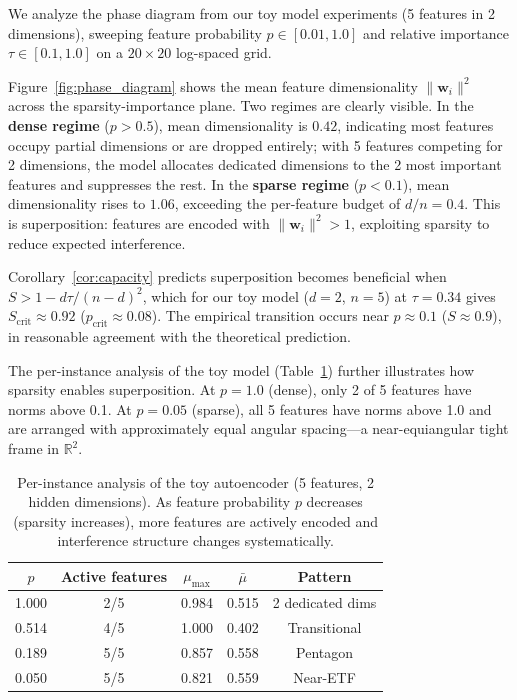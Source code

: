 We analyze the phase diagram from our toy model experiments (5 features in 2 dimensions), sweeping feature probability $p \in [0.01, 1.0]$ and relative importance $\tau \in [0.1, 1.0]$ on a $20 \times 20$ log-spaced grid.

Figure~\ref{fig:phase_diagram} shows the mean feature dimensionality $\|\mathbf{w}_i\|^2$ across the sparsity-importance plane. Two regimes are clearly visible. In the \textbf{dense regime} ($p > 0.5$), mean dimensionality is $0.42$, indicating most features occupy partial dimensions or are dropped entirely; with 5 features competing for 2 dimensions, the model allocates dedicated dimensions to the 2 most important features and suppresses the rest. In the \textbf{sparse regime} ($p < 0.1$), mean dimensionality rises to $1.06$, exceeding the per-feature budget of $d/n = 0.4$. This is superposition: features are encoded with $\|\mathbf{w}_i\|^2 > 1$, exploiting sparsity to reduce expected interference.

Corollary~\ref{cor:capacity} predicts superposition becomes beneficial when $S > 1 - d\tau/(n-d)^2$, which for our toy model ($d=2$, $n=5$) at $\tau = 0.34$ gives $S_{\text{crit}} \approx 0.92$ ($p_{\text{crit}} \approx 0.08$). The empirical transition occurs near $p \approx 0.1$ ($S \approx 0.9$), in reasonable agreement with the theoretical prediction.

The per-instance analysis of the toy model (Table~\ref{tab:toy_instances}) further illustrates how sparsity enables superposition. At $p = 1.0$ (dense), only 2 of 5 features have norms above 0.1. At $p = 0.05$ (sparse), all 5 features have norms above 1.0 and are arranged with approximately equal angular spacing---a near-equiangular tight frame in $\mathbb{R}^2$.

\begin{table}[t]
\centering
\caption{Per-instance analysis of the toy autoencoder (5 features, 2 hidden dimensions). As feature probability $p$ decreases (sparsity increases), more features are actively encoded and interference structure changes systematically.}
\label{tab:toy_instances}
\small
\begin{tabular}{ccccc}
\toprule
$p$ & \textbf{Active features} & $\mu_{\max}$ & $\bar{\mu}$ & \textbf{Pattern} \\
\midrule
1.000 & 2/5 & 0.984 & 0.515 & 2 dedicated dims \\
0.514 & 4/5 & 1.000 & 0.402 & Transitional \\
0.189 & 5/5 & 0.857 & 0.558 & Pentagon \\
0.050 & 5/5 & 0.821 & 0.559 & Near-ETF \\
\bottomrule
\end{tabular}
\end{table}

